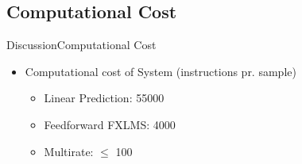 \subsection{Computational Cost}

\begin{frame}{Discussion}{Computational Cost}		
\begin{itemize}
\item Computational cost of System (instructions pr. sample)
	\begin{itemize}
		\item Linear Prediction: 55000 
		\item Feedforward FXLMS: 4000 
		\item Multirate: $\leq$ 100
	\end{itemize}
\end{itemize}

\end{frame}
